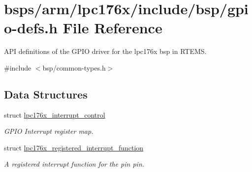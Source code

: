 \hypertarget{gpio-defs_8h}{}\section{bsps/arm/lpc176x/include/bsp/gpio-\/defs.h File Reference}
\label{gpio-defs_8h}


A\+PI definitions of the G\+P\+IO driver for the lpc176x bsp in R\+T\+E\+MS.  


{\ttfamily \#include $<$bsp/common-\/types.\+h$>$}\newline
\subsection*{Data Structures}
\begin{DoxyCompactItemize}
\item 
struct \mbox{\hyperlink{structlpc176x__interrupt__control}{lpc176x\+\_\+interrupt\+\_\+control}}
\begin{DoxyCompactList}\small\item\em G\+P\+IO Interrupt register map. \end{DoxyCompactList}\item 
struct \mbox{\hyperlink{structlpc176x__registered__interrupt__function}{lpc176x\+\_\+registered\+\_\+interrupt\+\_\+function}}
\begin{DoxyCompactList}\small\item\em A registered interrupt function for the pin \textquotesingle{}pin\textquotesingle{}. \end{DoxyCompactList}\end{DoxyCompactItemize}
